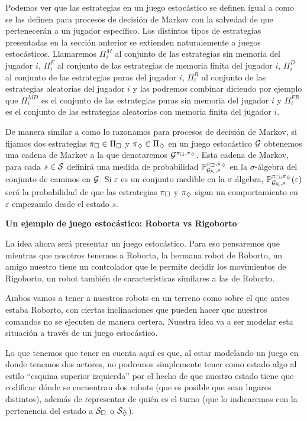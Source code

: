 Podemos ver que las estrategias en un juego estocástico se definen igual a como
se las definen para procesos de decisión de Markov con la salvedad de que
pertenecerán a un jugador específico. Los distintos tipos de estrategias
presentadas en la sección anterior se extienden naturalemente a juegos
estocásticos. Llamaremos $\Pi^{M}_i$ al conjunto de las estrategias sin memoria
del jugador $i$, $\Pi^{F}_i$ al conjunto de las estrategias de memoria finita
del jugador $i$, $\Pi^{D}_i$ al conjunto de las estrategias puras del jugador
$i$, $\Pi^{R}_i$ al conjunto de las estrategias aleatorias del jugador $i$ y
las podremos combinar diciendo por ejemplo que $\Pi^{MD}_i$ es el conjunto de
las estrategias puras sin memoria del jugador $i$ y $\Pi^{FR}_i$ es el conjunto
de las estrategias aleatorias con memoria finita del jugador $i$.

De manera similar a como lo razonamos para procesos de decisión de Markov, si
fijamos dos estrategias $\pi_\square \in \Pi_\square$ y $\pi_\diamondsuit \in \Pi_\diamondsuit$
en un juego estocástico $\mathcal{G}$ obtenemos una cadena de Markov a la que
denotaremos $\mathcal{G}^{\pi_\square, \pi_\diamondsuit}$. Esta cadena de Markov, para cada $s \in
	\mathcal{S}$ definirá una medida de probabilidad $\mathbb{P}_{\mathcal{G}_{\mathcal{K}}, s}^{\pi_\square, \pi_\diamondsuit}$ en la $\sigma$-álgebra del
conjunto de caminos en $\mathcal{G}$. Si $\varepsilon$ es un conjunto medible en la
$\sigma$-álgebra, $\mathbb{P}_{\mathcal{G}_{\mathcal{K}}, s}^{\pi_\square, \pi_\diamondsuit}(\varepsilon)$ será la probabilidad de que las
estrategias $\pi_\square$ y $\pi_\diamondsuit$ sigan un comportamiento en $\varepsilon$
empezando desde el estado $s$.

\textbf{Un ejemplo de juego estocástico: Roborta vs Rigoborto}

La idea ahora será presentar un juego estocástico. Para eso pensaremos que
mientras que nosotros tenemos a Roborta, la hermana robot de Roborto, un amigo
nuestro tiene un controlador que le permite decidir los movimientos de
Rigoborto, un robot también de características similares a las de Roborto.

Ambos vamos a tener a nuestros robots en un terreno como sobre el que antes
estaba Roborto, con ciertas inclinaciones que pueden hacer que nuestros
comandos no se ejecuten de manera certera. Nuestra idea va a ser modelar esta
situación a través de un juego estocástico.

Lo que tenemos que tener en cuenta aquí es que, al estar modelando un juego en
donde tenemos dos actores, no podremos simplemente tener como estado algo al
estilo ``esquina superior izquierda'' por el hecho de que nuestro estado tiene
que codificar dónde se encuentran dos robots (que es posible que sean lugares
distintos), además de representar de quién es el turno (que lo indicaremos con
la pertenencia del estado a $\mathcal{S}_\square$ o $\mathcal{S}_\diamondsuit$).

